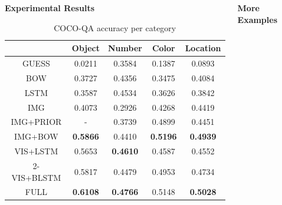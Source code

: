 \documentclass[serif,mathserif,final]{beamer}
\renewcommand{\*}[1]{\textbf{#1}}
\begin{document}
\begin{frame}{}
\begin{columns}[t]
\begin{column}{0.32\linewidth}
\begin{block}{\bf{\large Experimental Results}}
\begin{table}[t!]
\caption{COCO-QA accuracy per category}
\small
\label{tab:cocoqa_acc_breakdown}
\begin{center}
\begin{tabular}{c c c c c}
\hline
           &   Object  &   Number &   Color   & Location \\
\hline
GUESS      &   0.0211  &   0.3584 &   0.1387  & 0.0893   \\
BOW        &   0.3727  &   0.4356 &   0.3475  & 0.4084   \\
LSTM       &   0.3587  &   0.4534 &   0.3626  & 0.3842   \\
IMG        &   0.4073  &   0.2926 &   0.4268  & 0.4419   \\
IMG+PRIOR  &   -       &   0.3739 &   0.4899  & 0.4451   \\
IMG+BOW    &\*{0.5866} &   0.4410 &\*{0.5196} &\*{0.4939}\\
VIS+LSTM   &   0.5653  &\*{0.4610}&   0.4587  & 0.4552   \\
2-VIS+BLSTM&   0.5817  &   0.4479 &   0.4953  & 0.4734   \\
FULL       &\*{0.6108} &\*{0.4766}&   0.5148  &\*{0.5028}\\
\hline
\end{tabular}
\end{center}
\end{table}

\end{block}
\vfill

\endminipage
\end{column}

\begin{column}{0.32\linewidth}
\minipage[c][0.9\textheight][s]{\columnwidth}
\vfill

\begin{block}{\bf{\large More Examples}}


\end{block}
\end{column}
\end{columns}
\end{frame}
\end{document}
